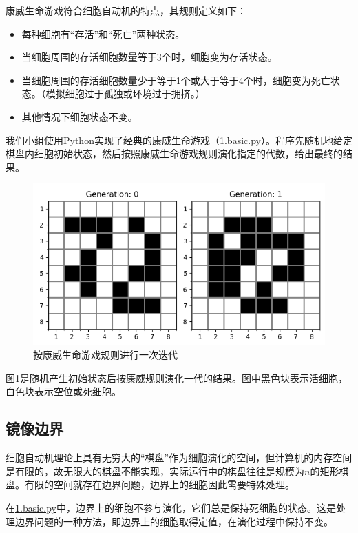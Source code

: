 \documentclass{ctexart}
\begin{document}
康威生命游戏符合细胞自动机的特点，其规则定义如下：

\begin{itemize}
  \item 每种细胞有“存活”和“死亡”两种状态。
  \item 当细胞周围的存活细胞数量等于3个时，细胞变为存活状态。
  \item 当细胞周围的存活细胞数量少于等于1个或大于等于4个时，细胞变为死亡状态。（模拟细胞过于孤独或环境过于拥挤。）
  \item 其他情况下细胞状态不变。
\end{itemize}

我们小组使用Python实现了经典的康威生命游戏（\underline{1.basic.py}）。程序先随机地给定棋盘内细胞初始状态，然后按照康威生命游戏规则演化指定的代数，给出最终的结果。

\begin{figure}[ht]
  \centering
  \includegraphics[scale=0.75]{cellular-automation.png}
  \caption{按康威生命游戏规则进行一次迭代}
  \label{fig:cellular-automation}
\end{figure}

图\ref{fig:cellular-automation}是随机产生初始状态后按康威规则演化一代的结果。图中黑色块表示活细胞，白色块表示空位或死细胞。

\subsection{镜像边界}

细胞自动机理论上具有无穷大的“棋盘”作为细胞演化的空间，但计算机的内存空间是有限的，故无限大的棋盘不能实现，实际运行中的棋盘往往是规模为$n$的矩形棋盘。有限的空间就存在边界问题，边界上的细胞因此需要特殊处理。

在\underline{1.basic.py}中，边界上的细胞不参与演化，它们总是保持死细胞的状态。这是处理边界问题的一种方法，即边界上的细胞取得定值，在演化过程中保持不变。
\end{document}
